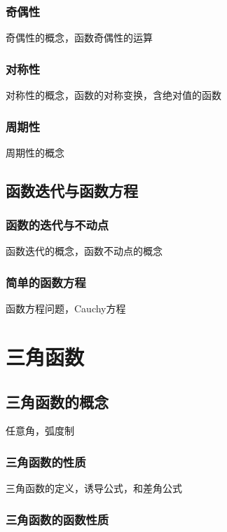 \documentclass[lang=cn, zihao=4.5]{elegantbook}
\begin{document}
\subsection{奇偶性}

奇偶性的概念，函数奇偶性的运算

\subsection{对称性}

对称性的概念，函数的对称变换，含绝对值的函数

\subsection{周期性}

周期性的概念

\section{函数迭代与函数方程}

\subsection{函数的迭代与不动点}

函数迭代的概念，函数不动点的概念

\subsection{简单的函数方程}

函数方程问题，Cauchy方程

\chapter{三角函数}

\section{三角函数的概念}

任意角，弧度制

\subsection{三角函数的性质}

三角函数的定义，诱导公式，和差角公式

\subsection{三角函数的函数性质}
\end{document}
